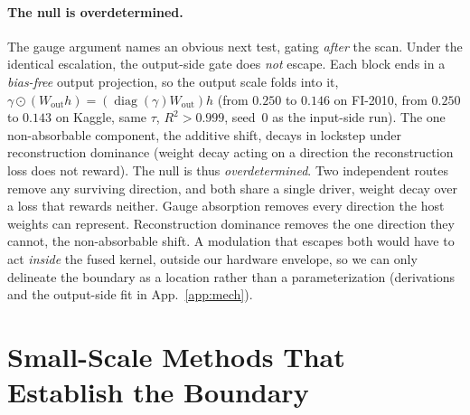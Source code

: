 \documentclass{article}
\DeclareMathOperator{\diagop}{diag}
\newcommand{\diag}{\diagop}
\begin{document}
\paragraph{The null is overdetermined.}
The gauge argument names an obvious next test, gating \emph{after} the scan. Under
the identical escalation, the output-side gate does \emph{not} escape. Each block
ends in a \emph{bias-free} output projection, so the output scale folds into it,
$\gamma\odot(W_{\text{out}}h)=(\diag(\gamma)W_{\text{out}})h$ (from $0.250$ to
$0.146$ on FI-2010, from $0.250$ to $0.143$ on Kaggle, same $\tau$, $R^2>0.999$,
seed~0 as the input-side run). The one non-absorbable component, the additive shift, decays in
lockstep under reconstruction dominance (weight decay acting on a direction the
reconstruction loss does not reward). The null is thus \emph{overdetermined}.
Two independent routes remove any surviving direction, and both share a single
driver, weight decay over a loss that rewards neither. Gauge absorption removes
every direction the host weights can represent. Reconstruction dominance removes
the one direction they cannot, the non-absorbable shift. A modulation that escapes
both would have to act \emph{inside} the fused kernel, outside our hardware
envelope, so we can only delineate the boundary as a location rather than a
parameterization (derivations and the output-side fit in App.~\ref{app:mech}).

\section{Small-Scale Methods That Establish the Boundary}\label{sec:methods}
\end{document}

